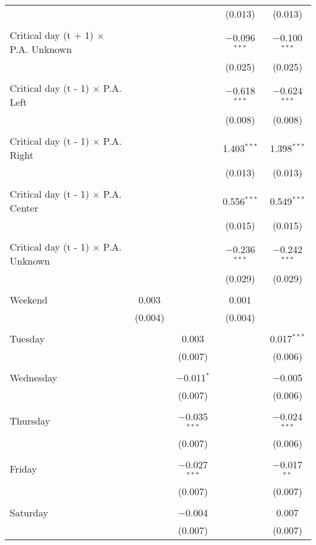 \documentclass[
]{article}
\begin{document}
\begin{table}[!htbp]
{\begin{tabular}{@{\extracolsep{5pt}}lcccc}
  &  &  & (0.013) & (0.013) \\ 
  & & & & \\ 
 Critical day (t + 1) $\times$ P.A. Unknown &  &  & $-$0.096$^{***}$ & $-$0.100$^{***}$ \\ 
  &  &  & (0.025) & (0.025) \\ 
  & & & & \\ 
 Critical day (t - 1) $\times$ P.A. Left &  &  & $-$0.618$^{***}$ & $-$0.624$^{***}$ \\ 
  &  &  & (0.008) & (0.008) \\ 
  & & & & \\ 
 Critical day (t - 1) $\times$ P.A. Right &  &  & 1.403$^{***}$ & 1.398$^{***}$ \\ 
  &  &  & (0.013) & (0.013) \\ 
  & & & & \\ 
 Critical day (t - 1) $\times$ P.A. Center &  &  & 0.556$^{***}$ & 0.549$^{***}$ \\ 
  &  &  & (0.015) & (0.015) \\ 
  & & & & \\ 
 Critical day (t - 1) $\times$ P.A. Unknown &  &  & $-$0.236$^{***}$ & $-$0.242$^{***}$ \\ 
  &  &  & (0.029) & (0.029) \\ 
  & & & & \\ 
 Weekend & 0.003 &  & 0.001 &  \\ 
  & (0.004) &  & (0.004) &  \\ 
  & & & & \\ 
 Tuesday &  & 0.003 &  & 0.017$^{***}$ \\ 
  &  & (0.007) &  & (0.006) \\ 
  & & & & \\ 
 Wednesday &  & $-$0.011$^{*}$ &  & $-$0.005 \\ 
  &  & (0.007) &  & (0.006) \\ 
  & & & & \\ 
 Thursday &  & $-$0.035$^{***}$ &  & $-$0.024$^{***}$ \\ 
  &  & (0.007) &  & (0.006) \\ 
  & & & & \\ 
 Friday &  & $-$0.027$^{***}$ &  & $-$0.017$^{**}$ \\ 
  &  & (0.007) &  & (0.007) \\ 
  & & & & \\ 
 Saturday &  & $-$0.004 &  & 0.007 \\ 
  &  & (0.007) &  & (0.007) \\ 

\end{tabular}}
\end{table}
\end{document}
